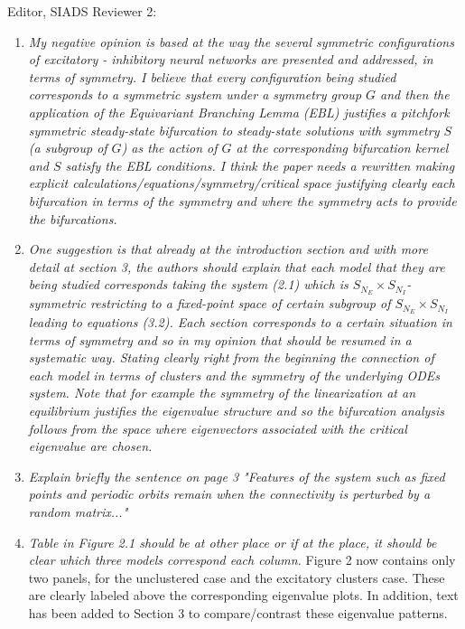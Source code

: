 \documentclass[11pt]{letter}
\begin{document}
\begin{letter}{Editor, SIADS}
Reviewer 2:
\begin{enumerate}
\item \emph{My negative opinion is based at the way the several symmetric configurations of excitatory - inhibitory neural networks are presented and addressed, in terms of symmetry. I believe that every configuration being studied corresponds to a symmetric system under a symmetry group $G$ and then the application of the Equivariant Branching Lemma (EBL) justifies a pitchfork symmetric steady-state bifurcation to steady-state solutions with symmetry $S$ (a subgroup of $G$) as the action of $G$ at the corresponding bifurcation kernel and $S$ satisfy the EBL conditions. I think the paper needs a rewritten making explicit calculations/equations/symmetry/critical space justifying clearly each bifurcation in terms of the symmetry and where the symmetry acts to provide the bifurcations.}
\vspace{4mm} 

\item \emph{One suggestion is that already at the introduction section and with more detail at section 3, the authors should explain that each model that they are being studied corresponds taking the system (2.1) which is $S_{N_E} \times S_{N_I}$-symmetric restricting to a fixed-point space of certain subgroup of $S_{N_E} \times S_{N_I}$ leading to equations (3.2). Each section corresponds to a certain situation in terms of symmetry and so in my opinion that should be resumed in a systematic way. Stating clearly right from the beginning the connection of each model in terms of clusters and the symmetry of the underlying ODEs system. Note that for example the symmetry of the linearization at an equilibrium justifies the eigenvalue structure and so the bifurcation analysis follows from the space where eigenvectors associated with the critical eigenvalue are chosen.}
\vspace{4mm} 

\item \emph{Explain briefly the sentence on page 3 "Features of the system such as fixed points and periodic orbits remain when the connectivity is perturbed by a random matrix..."}
\vspace{4mm} 

\item \emph{Table in Figure 2.1 should be at other place or if at the place, it should be clear which three models correspond each column.} Figure 2 now contains only two panels, for the unclustered case and the excitatory clusters case. These are clearly labeled above the corresponding eigenvalue plots. In addition, text has been added to Section 3 to compare/contrast these eigenvalue patterns.
\vspace{4mm} 


\end{enumerate}
\end{letter}
\end{document}
